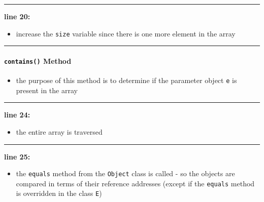 \vspace{0.1cm}
\noindent
\textcolor{RedOrange}{\rule{\textwidth}{0.5pt}}
\vspace{-0.1cm}

\noindent
\begin{minipage}{0.15\textwidth}
    \textcolor{RedOrange}{\textbf{line 20:}}
\end{minipage}
\begin{minipage}{0.85\textwidth}
    \begin{itemize}
        \item[] increase the \texttt{size} variable since there is one more element in the array
    \end{itemize}
\end{minipage}

\vspace{0.1cm}
\noindent
\textcolor{RedOrange}{\rule{\textwidth}{0.5pt}}


\paragraph*{\texttt{contains()} Method}



\begin{itemize}
    \item[] the purpose of this method is to determine if the parameter object \texttt{e} is present in the array 
\end{itemize}

\noindent
\textcolor{RedOrange}{\rule{\textwidth}{0.5pt}}
\vspace{-0.1cm}

\noindent
\begin{minipage}{0.15\textwidth}
    \textcolor{RedOrange}{\textbf{line 24:}}
\end{minipage}
\begin{minipage}{0.85\textwidth}
    \begin{itemize}
        \item[] the entire array is traversed
    \end{itemize}
\end{minipage}

\vspace{0.1cm}
\noindent
\textcolor{RedOrange}{\rule{\textwidth}{0.5pt}}
\vspace{-0.1cm}

\noindent
\begin{minipage}{0.15\textwidth}
    \textcolor{RedOrange}{\textbf{line 25:}}
\end{minipage}
\begin{minipage}{0.85\textwidth}
    \begin{itemize}
        \item[] the \texttt{equals} method from the \texttt{Object} class is called - so the objects are compared in terms of their reference addresses (except if the \texttt{equals} method is overridden in the class \texttt{E})
    \end{itemize}
\end{minipage}

